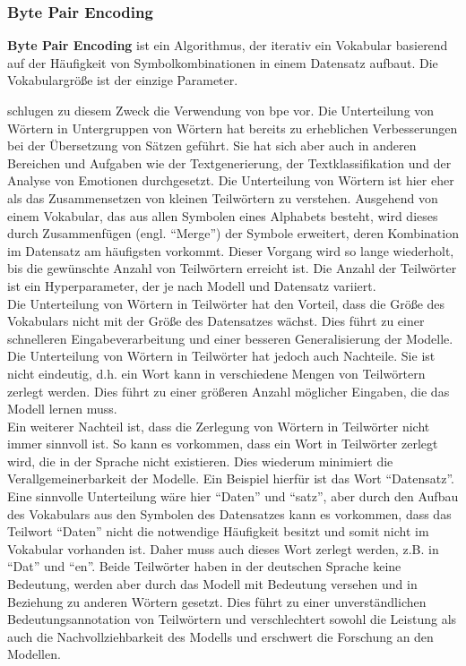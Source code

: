 \subsubsection{Byte Pair Encoding}
\begin{definition}\label{def:bpe}
    \textbf{Byte Pair Encoding} ist ein Algorithmus, der iterativ ein Vokabular basierend auf der Häufigkeit von Symbolkombinationen in einem Datensatz aufbaut.
    Die Vokabulargröße ist der einzige Parameter.
\end{definition}
\citet{bpe} schlugen zu diesem Zweck die Verwendung von \ac{bpe} vor.
Die Unterteilung von Wörtern in Untergruppen von Wörtern hat bereits zu erheblichen Verbesserungen bei der Übersetzung von Sätzen geführt.
Sie hat sich aber auch in anderen Bereichen und Aufgaben wie der Textgenerierung, der Textklassifikation und der Analyse von Emotionen durchgesetzt.
Die Unterteilung von Wörtern ist hier eher als das Zusammensetzen von kleinen Teilwörtern zu verstehen.
Ausgehend von einem Vokabular, das aus allen Symbolen eines Alphabets besteht, wird dieses durch Zusammenfügen (engl. \enquote{Merge}) der Symbole erweitert, deren Kombination im Datensatz am häufigsten vorkommt.
Dieser Vorgang wird so lange wiederholt, bis die gewünschte Anzahl von Teilwörtern erreicht ist.
Die Anzahl der Teilwörter ist ein Hyperparameter, der je nach Modell und Datensatz variiert.\\

Die Unterteilung von Wörtern in Teilwörter hat den Vorteil, dass die Größe des Vokabulars nicht mit der Größe des Datensatzes wächst.
Dies führt zu einer schnelleren Eingabeverarbeitung und einer besseren Generalisierung der Modelle.
Die Unterteilung von Wörtern in Teilwörter hat jedoch auch Nachteile.
Sie ist nicht eindeutig, d.h. ein Wort kann in verschiedene Mengen von Teilwörtern zerlegt werden.
Dies führt zu einer größeren Anzahl möglicher Eingaben, die das Modell lernen muss.\\

Ein weiterer Nachteil ist, dass die Zerlegung von Wörtern in Teilwörter nicht immer sinnvoll ist.
So kann es vorkommen, dass ein Wort in Teilwörter zerlegt wird, die in der Sprache nicht existieren.
Dies wiederum minimiert die Verallgemeinerbarkeit der Modelle.
Ein Beispiel hierfür ist das Wort \enquote{Datensatz}.
Eine sinnvolle Unterteilung wäre hier \enquote{Daten} und \enquote{satz}, aber durch den Aufbau des Vokabulars aus den Symbolen des Datensatzes kann es vorkommen, dass das Teilwort \enquote{Daten} nicht die notwendige Häufigkeit besitzt und somit nicht im Vokabular vorhanden ist.
Daher muss auch dieses Wort zerlegt werden, z.B. in \enquote{Dat} und \enquote{en}.
Beide Teilwörter haben in der deutschen Sprache keine Bedeutung, werden aber durch das Modell mit Bedeutung versehen und in Beziehung zu anderen Wörtern gesetzt.
Dies führt zu einer unverständlichen Bedeutungsannotation von Teilwörtern und verschlechtert sowohl die Leistung als auch die Nachvollziehbarkeit des Modells und erschwert die Forschung an den Modellen.

